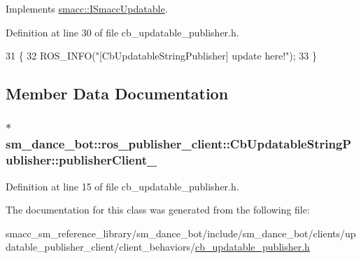 Implements \hyperlink{classsmacc_1_1ISmaccUpdatable_a84ee0520cbefdb1d412bed54650b028e}{smacc\+::\+I\+Smacc\+Updatable}.



Definition at line 30 of file cb\+\_\+updatable\+\_\+publisher.\+h.


\begin{DoxyCode}
31     \{
32         ROS\_INFO(\textcolor{stringliteral}{"[CbUpdatableStringPublisher] update here!"});
33     \}
\end{DoxyCode}


\subsection{Member Data Documentation}
\subsubsection[{\texorpdfstring{publisher\+Client\+\_\+}{publisherClient_}}]{$\ast$ sm\+\_\+dance\+\_\+bot\+::ros\+\_\+publisher\+\_\+client\+::\+Cb\+Updatable\+String\+Publisher\+::publisher\+Client\+\_\+}\hypertarget{classsm__dance__bot_1_1ros__publisher__client_1_1CbUpdatableStringPublisher_a9300324c9279e16474832966e5692201}{}\label{classsm__dance__bot_1_1ros__publisher__client_1_1CbUpdatableStringPublisher_a9300324c9279e16474832966e5692201}


Definition at line 15 of file cb\+\_\+updatable\+\_\+publisher.\+h.



The documentation for this class was generated from the following file\+:\begin{DoxyCompactItemize}
\item 
smacc\+\_\+sm\+\_\+reference\+\_\+library/sm\+\_\+dance\+\_\+bot/include/sm\+\_\+dance\+\_\+bot/clients/updatable\+\_\+publisher\+\_\+client/client\+\_\+behaviors/\hyperlink{cb__updatable__publisher_8h}{cb\+\_\+updatable\+\_\+publisher.\+h}\end{DoxyCompactItemize}
